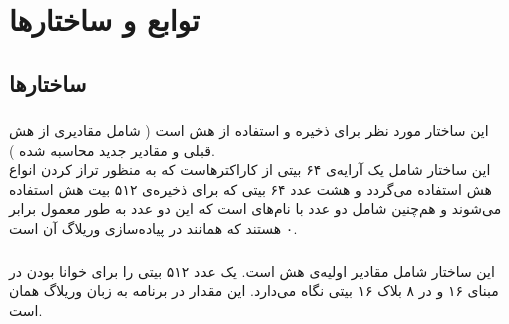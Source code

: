 \chapter{توابع و ساختارها}

\section{ \textbf{ساختارها}}

\subsection{}
\label{subsec:sph-skein-big-context}
این ساختار مورد نظر برای ذخیره و استفاده از هش است (‌ شامل مقادیری از هش قبلی و مقادیر جدید محاسبه شده ). \\ این ساختار شامل یک آرایه‌ی ۶۴ بیتی از کاراکترهاست که به منظور تراز کردن انواع هش استفاده می‌گردد و  هشت عدد ۶۴ بیتی  که برای ذخیره‌ی ۵۱۲ بیت هش  استفاده می‌شوند  و هم‌چنین شامل دو عدد با نام‌های  است که این دو عدد به طور معمول برابر ۰ هستند که همانند  در پیاده‌سازی وریلاگ آن است.



\subsection{}
\label{subsec:IV512}
این ساختار شامل مقادیر اولیه‌ی هش است. یک عدد ۵۱۲ بیتی را برای خوانا بودن در مبنای ۱۶ و در ۸ بلاک ۱۶ بیتی نگاه می‌دارد. این مقدار در برنامه‌ به زبان وریلاگ همان  است.
\subsection{}
\label{subsec:UBI-BIG}

